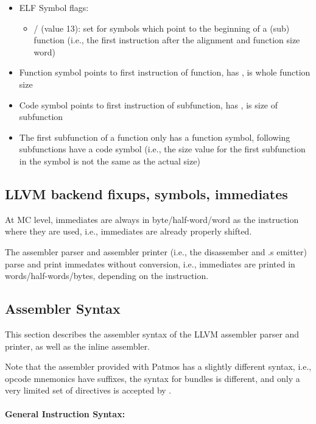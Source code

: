 \begin{itemize}
\item ELF Symbol flags:
  \begin{itemize}
  \item {} /  (value 13): set for symbols which point to the beginning of a (sub) function
      (i.e., the first instruction after the alignment and function size word)
  \end{itemize}
\item Function symbol points to first instruction of function, has ,  is whole function size
\item Code symbol points to first instruction of subfunction, has ,  is size of subfunction
\item The first subfunction of a function only has a function symbol, following subfunctions have a code symbol (i.e.,
  the size value for the first subfunction in the symbol is not the same as the actual size)
\end{itemize}

\subsection{LLVM backend fixups, symbols, immediates}

At MC level, immediates are always in byte/half-word/word as the instruction where they are used,
i.e., immediates are already properly shifted.

The assembler parser and assembler printer (i.e., the disassember and .s emitter) parse and print
immedates without conversion, i.e., immediates are printed in words/half-words/bytes, depending on
the instruction. 


\subsection{Assembler Syntax}

This section describes the assembler syntax of the LLVM assembler parser and printer, as well as the inline assembler.

Note that the  assembler provided with Patmos has a slightly different syntax, i.e., opcode mnemonics
have suffixes, the syntax for bundles is different, and only a very limited set of directives is accepted by .

\paragraph{General Instruction Syntax:}

